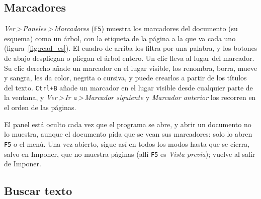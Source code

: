 \documentclass[12pt,
              article,
              oneside
              ]{memoir}
\newcommand*{\menu}[1]{\textit{#1}}
\newcommand*{\then}{\,>\,}
\newcommand*{\key}[1]{\texttt{#1}}
\begin{document}
\subsection{Marcadores}

%
\menu{Ver\then Paneles\then Marcadores} (\key{F5}) muestra los marcadores
del documento (su esquema) como un árbol, con la etiqueta de la página a la
que va cada uno (figura~\ref{fig:read_es}). El cuadro de arriba los filtra
por una palabra, y los botones de abajo despliegan o pliegan el árbol
entero. Un clic lleva al lugar del marcador. Su clic derecho añade un
marcador en el lugar visible, los renombra, borra, mueve y sangra, les da
color, negrita o cursiva, y puede crearlos a partir de los títulos del
texto. \key{Ctrl+B} añade un marcador en el lugar visible desde cualquier
parte de la ventana, y \menu{Ver\then Ir a\then Marcador siguiente} y
\menu{Marcador anterior} los recorren en el orden de las páginas.

El panel está oculto cada vez que el programa se abre, y abrir un
documento no lo muestra, aunque el documento pida que se vean sus
marcadores: solo lo abren \key{F5} o el menú. Una vez abierto, sigue así
en todos los modos hasta que se cierra, salvo en Imponer, que no muestra
páginas (allí \key{F5} es \menu{Vista previa}); vuelve al salir de
Imponer.

\subsection{Buscar texto}
\end{document}
